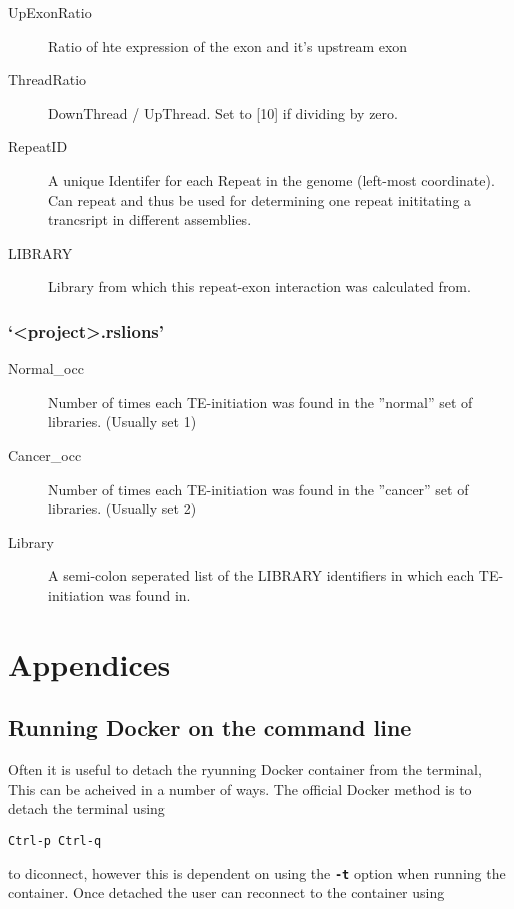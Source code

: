 \documentclass[11pt]{scrartcl}
\newcommand{\arrows}[1]{\textless #1\textgreater}
\begin{document}
\begin{description}
\item[UpExonRatio] Ratio of hte expression of the exon and it's upstream exon

\item[ThreadRatio] DownThread / UpThread. Set to [10] if dividing by zero.

\item[RepeatID] A unique Identifer for each Repeat in the genome (left-most
  coordinate). Can repeat and thus be used for determining one repeat
  inititating a trancsript in different assemblies.

\item[LIBRARY] Library from which this repeat-exon interaction was calculated from.
\end{description}


\subsubsection{`\arrows{project}.rslions'}
\begin{description}
\item[Normal\_occ] Number of times each TE-initiation was found in the ''normal'' set of libraries. (Usually set 1)

\item[Cancer\_occ] Number of times each TE-initiation was found in the ''cancer'' set of libraries. (Usually set 2)

\item[Library] A semi-colon seperated list of the LIBRARY identifiers in which each TE-initiation was found in.
\end{description}  

\clearpage
\appendix
\section{Appendices}
\subsection{Running Docker on the command line}

Often it is useful to detach the ryunning Docker container from the terminal, This can be acheived in a number of ways. The official Docker method is to detach the terminal using 

\texttt{Ctrl-p Ctrl-q}

to diconnect, however this is dependent on using the \texttt{\textbf{-t}} option when running the container. Once detached the user can reconnect to the container using
\end{document}
